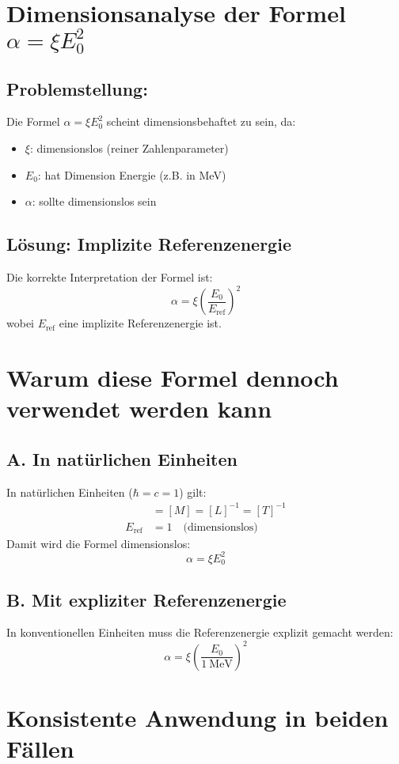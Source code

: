 \documentclass[12pt, a4paper]{article}
\begin{document}
	\section*{Dimensionsanalyse der Formel $\alpha = \xi E_0^2$}

\subsection*{Problemstellung:}
Die Formel $\alpha = \xi E_0^2$ scheint dimensionsbehaftet zu sein, da:
\begin{itemize}
	\item $\xi$: dimensionslos (reiner Zahlenparameter)
	\item $E_0$: hat Dimension Energie (z.B. in MeV)
	\item $\alpha$: sollte dimensionslos sein
\end{itemize}

\subsection*{Lösung: Implizite Referenzenergie}
Die korrekte Interpretation der Formel ist:
\[
\alpha = \xi \left(\frac{E_0}{E_{\text{ref}}}\right)^2
\]
wobei $E_{\text{ref}}$ eine implizite Referenzenergie ist.

\section*{Warum diese Formel dennoch verwendet werden kann}

\subsection*{A. In natürlichen Einheiten}
In natürlichen Einheiten ($\hbar = c = 1$) gilt:
\begin{align*}
	[E] &= [M] = [L]^{-1} = [T]^{-1} \\
	E_{\text{ref}} &= 1 \quad \text{(dimensionslos)}
\end{align*}
Damit wird die Formel dimensionslos:
\[
\alpha = \xi E_0^2
\]

\subsection*{B. Mit expliziter Referenzenergie}
In konventionellen Einheiten muss die Referenzenergie explizit gemacht werden:
\[
\alpha = \xi \left(\frac{E_0}{\SI{1}{\MeV}}\right)^2
\]

\section*{Konsistente Anwendung in beiden Fällen}
\end{document}
